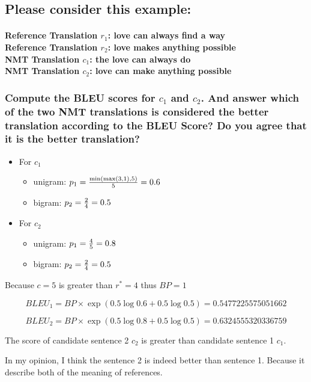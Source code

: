 \documentclass[12pt, letterpaper]{article}
\begin{document}
\subsection{Please consider this example:}
\paragraph{Reference Translation $r_1$: love can always find a way \\
Reference Translation $r_2$: love makes anything possible \\
NMT Translation $c_1$: the love can always do \\
NMT Translation $c_2$: love can make anything possible}

\subsubsection{Compute the BLEU scores for $c_1$ and $c_2$. And answer which of the two NMT translations is considered the better translation according to the BLEU Score? Do you agree that it is the better translation?}

\begin{itemize}[topsep=0pt, partopsep=0pt]
  \item For $c_1$ {
    \begin{itemize}
      \item unigram: $p_1 = {\min(\max(3, 1), 5) \over 5} = 0.6$
      \item bigram: $p_2 = {2 \over 4} = 0.5$
    \end{itemize}
  }
  \item For $c_2$ {
    \begin{itemize}
      \item unigram: $p_1 = {4 \over 5} = 0.8$
      \item bigram: $p_2 = {2 \over 4} = 0.5$
    \end{itemize}
  }
\end{itemize}

Because $c = 5$ is greater than $r^* = 4$ thus $BP = 1$

$$
BLEU_1 = BP \times \exp(0.5 \log 0.6 + 0.5 \log 0.5) = 0.5477225575051662
$$

$$
BLEU_2 = BP \times \exp(0.5 \log 0.8 + 0.5 \log 0.5) = 0.6324555320336759
$$

The score of candidate sentence 2 $c_2$ is greater than candidate sentence 1 $c_1$.

In my opinion, I think the sentence 2 is indeed better than sentence 1. Because it describe both of the meaning of references.
\end{document}
